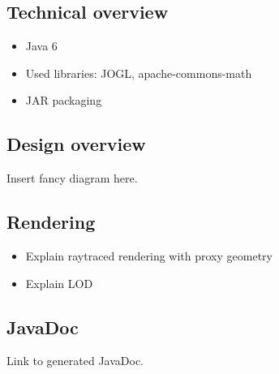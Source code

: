 \documentclass{scrartcl}
\begin{document}
\subsection{Technical overview}

\begin{itemize}
\item Java 6
\item Used libraries: JOGL, apache-commons-math
\item JAR packaging
\end{itemize}

\subsection{Design overview}

Insert fancy diagram here.

\subsection{Rendering}

\begin{itemize}
\item Explain raytraced rendering with proxy geometry
\item Explain LOD
\end{itemize}

\subsection{JavaDoc}

Link to generated JavaDoc.
\end{document}
